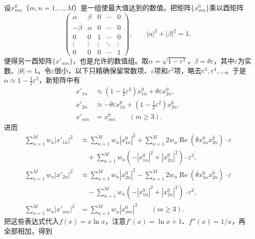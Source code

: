 \documentclass[fontsize=13pt,twoside,openany,headings=normal,parskip=false,bookmarkpackage=false,DIV=calc]{scrbook}
\begin{document}
设$x^0_{mn}$（$m,\allowbreak n=1,\allowbreak \ldots,\allowbreak M$）是一组使最大值达到的数值。把矩阵$\{x^0_{mn}\}$乘以酉矩阵
\[
\begin{pmatrix}
\alpha&\beta&0&\cdots&0\\
-\overline\beta&\overline\alpha&0&\cdots&0\\
0&0&1&\cdots&0\\
\vdots&\vdots&\vdots&\ddots&\vdots\\
0&0&0&\cdots&1
\end{pmatrix},\qquad |\alpha|^2+|\beta|^2=1,
\]
便得另一酉矩阵$\{x'_{mn}\}$，也是允许的数值组。取$\alpha=\sqrt{1-\varepsilon^2}$，$\beta=\theta\varepsilon$，其中$\varepsilon$为实数、$|\theta|=1$。令$\varepsilon$很小，以下只精确保留常数项、$\varepsilon$项和$\varepsilon^2$项，略去$\varepsilon^3,\allowbreak \varepsilon^4,\allowbreak \ldots$。于是$\alpha\approx1-\tfrac12\varepsilon^2$，新矩阵中有
\begin{align*}
 x'_{1n}&\approx(1-\tfrac12\varepsilon^2)x^0_{1n}+\theta\varepsilon x^0_{2n},\\
 x'_{2n}&\approx-\overline\theta\varepsilon x^0_{1n}+(1-\tfrac12\varepsilon^2)x^0_{2n},\\
 x'_{mn}&=x^0_{mn}\qquad(m\geq3).
\end{align*}\hypertarget{origpage-204}{}\label{origpage-204}进而
\begin{align*}
\sum_{n=1}^Mw_n|x'_{1n}|^2
&\approx\sum_{n=1}^Mw_n|x^0_{1n}|^2
+\sum_{n=1}^M2w_n\operatorname{Re}(\overline\theta x^0_{1n}\overline{x^0_{2n}})\cdot\varepsilon\\
&\quad+\sum_{n=1}^Mw_n(-|x^0_{1n}|^2+|x^0_{2n}|^2)\cdot\varepsilon^2,\\
\sum_{n=1}^Mw_n|x'_{2n}|^2
&\approx\sum_{n=1}^Mw_n|x^0_{2n}|^2
-\sum_{n=1}^M2w_n\operatorname{Re}(\overline\theta x^0_{1n}\overline{x^0_{2n}})\cdot\varepsilon\\
&\quad-\sum_{n=1}^Mw_n(-|x^0_{1n}|^2+|x^0_{2n}|^2)\cdot\varepsilon^2,\\
\sum_{n=1}^Mw_n|x'_{mn}|^2&=\sum_{n=1}^Mw_n|x^0_{mn}|^2\qquad(m\geq3).
\end{align*}
把这些表达式代入$f(x)=x\ln x$，注意$f'(x)=\ln x+1$、$f''(x)=1/x$，再全部相加，得到
\end{document}
